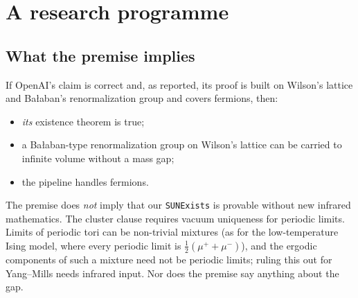 \documentclass[11pt]{article}
\theoremstyle{definition}
\theoremstyle{remark}
\newcommand{\lean}[1]{\texttt{\hyphenchar\font=-1\relax #1}}
\begin{document}
\section{A research programme}\label{sec:programme}

\subsection{What the premise implies}
If OpenAI's claim is correct and, as reported, its proof is built on Wilson's lattice and
Ba{\l}aban's renormalization group and covers fermions, then:
\begin{itemize}[leftmargin=*]
\item \emph{its} existence theorem is true;
\item a Ba{\l}aban-type renormalization group on Wilson's lattice can be carried to infinite
  volume without a mass gap;
\item the pipeline handles fermions.
\end{itemize}
The premise does \emph{not} imply that our \lean{SUNExists} is provable without new infrared
mathematics. The cluster clause requires vacuum uniqueness for periodic limits. Limits of periodic
tori can be non-trivial mixtures (as for the low-temperature Ising model, where every periodic limit
is $\tfrac12(\mu^++\mu^-)$), and the ergodic components of such a mixture need not be periodic
limits; ruling this out for Yang--Mills needs infrared input. Nor does the premise say anything
about the gap.
\end{document}
